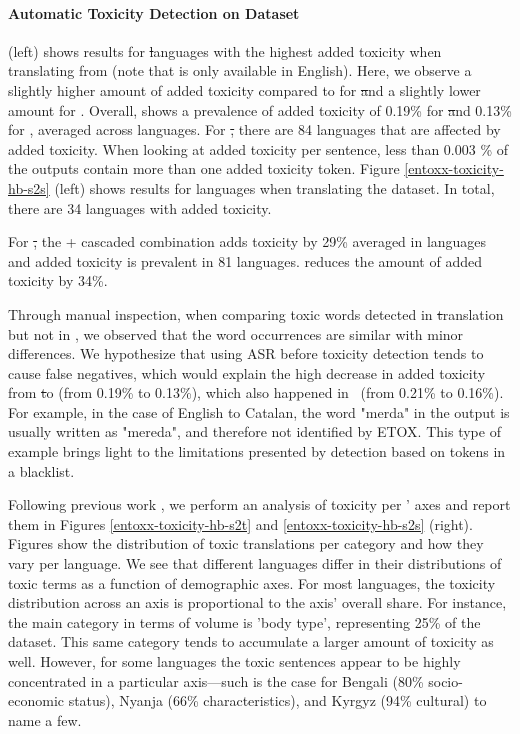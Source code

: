 \paragraph{Automatic Toxicity Detection on \holisticbias Dataset}  %
 (left) shows results for \st languages with the highest added toxicity when translating \holisticbias from \engx (note that \holisticbias is only available in English).%
Here, we observe a slightly higher amount of added toxicity compared to \fleurs for \st and a slightly lower amount for \sst. Overall, \holisticbias shows a prevalence of added toxicity of 0.19\% for \st and 0.13\% for \sst, averaged across languages. 
For \st, there are 84 languages that are affected by added toxicity. When looking at added toxicity per sentence, less than 0.003 \% of the outputs contain more than one added toxicity token. 
Figure \ref{entoxx-toxicity-hb-s2s} (left) shows results for \sst languages when translating the \holisticbias dataset. %
In total, there are 34 languages with added toxicity. %

For \st, the \whisperlarge + \nllbmedium cascaded combination adds toxicity by 29\% averaged in languages and added toxicity is prevalent in 81 languages. \mfourtlg reduces the amount of added toxicity by 34\%.

Through manual inspection, when comparing toxic words detected in \st translation but not in \sst, we observed that the word occurrences are similar with minor differences. We hypothesize that using ASR before toxicity detection tends to cause false negatives, which would explain the high decrease in added toxicity from \st to \sst (from 0.19\% to 0.13\%), which also happened in \fleurs\ (from 0.21\% to 0.16\%). For example, in the case of English to Catalan, the word "merda" in the \sst output is usually written as "mereda", and therefore not identified by ETOX. This type of example brings light to the limitations presented by detection based on tokens in a blacklist. %

Following previous work \citep{costajussa2023toxicity}, we perform an analysis of toxicity per \holisticbias' axes and report them in Figures \ref{entoxx-toxicity-hb-s2t} and \ref{entoxx-toxicity-hb-s2s} (right). Figures show the distribution of toxic translations per category and how they vary per language. We see that different languages differ in their distributions of toxic terms as a function of demographic axes. For most languages, the toxicity distribution across an axis is proportional to the axis' overall share. For instance, the main category in terms of volume is 'body type', representing 25\% of the dataset. This same category tends to accumulate a larger amount of toxicity as well. However, for some languages the toxic sentences appear to be highly concentrated in a particular axis—such is the case for Bengali (80\% socio-economic status), Nyanja (66\% characteristics), and Kyrgyz (94\% cultural) to name a few.

